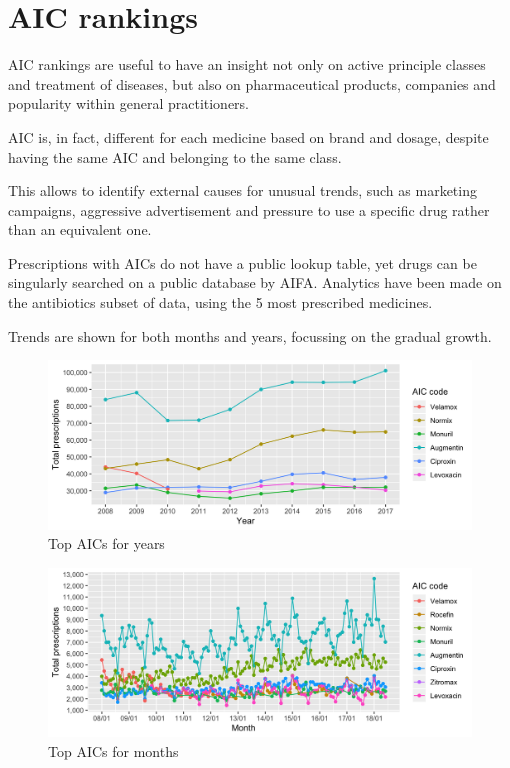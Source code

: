\section{AIC rankings}
AIC rankings are useful to have an insight not only on active principle classes and treatment of diseases, but also on pharmaceutical products, companies and popularity within general practitioners.

AIC is, in fact, different for each medicine based on brand and dosage, despite having the same AIC and belonging to the same class.

This allows to identify external causes for unusual trends, such as marketing campaigns, aggressive advertisement and pressure to use a specific drug rather than an equivalent one.

Prescriptions with AICs do not have a public lookup table, yet drugs can be singularly searched on a public database by AIFA. Analytics have been made on the antibiotics subset of data, using the 5 most prescribed medicines.

Trends are shown for both months and years, focussing on the gradual growth.

\begin{figure}[h]
	\centering
	\includegraphics[scale=0.3]{../plots/top_aic-year.png}
	\caption{\small Top AICs for years}
\end{figure}

\begin{figure}[h]
	\centering
	\includegraphics[scale=0.3]{../plots/top_aic-month.png}
	\caption{\small Top AICs for months}
\end{figure}

